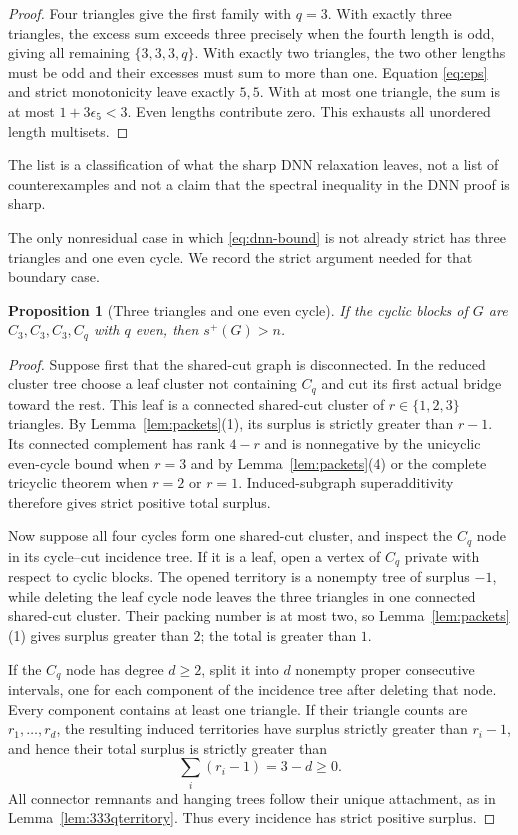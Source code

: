 \documentclass[11pt]{article}
\newtheorem{proposition}[theorem]{Proposition}
\theoremstyle{remark}
\begin{document}
\begin{proof}
Four triangles give the first family with $q=3$.  With exactly three
triangles, the excess sum exceeds three precisely when the fourth length is
odd, giving all remaining $\{3,3,3,q\}$.  With exactly two triangles, the two
other lengths must be odd and their excesses must sum to more than one.
Equation \eqref{eq:eps} and strict monotonicity leave exactly $5,5$.  With at
most one triangle, the sum is at most
$1+3\epsilon_5<3$.  Even lengths contribute zero.  This exhausts all
unordered length multisets.
\end{proof}

The list is a classification of what the sharp DNN relaxation leaves, not a
list of counterexamples and not a claim that the spectral inequality in the
DNN proof is sharp.

The only nonresidual case in which \eqref{eq:dnn-bound} is not already strict
has three triangles and one even cycle.  We record the strict argument needed
for that boundary case.

\begin{proposition}[Three triangles and one even cycle]\label{prop:333even}
If the cyclic blocks of $G$ are $C_3,C_3,C_3,C_q$ with $q$ even, then
$s^+(G)>n$.
\end{proposition}

\begin{proof}
Suppose first that the shared-cut graph is disconnected.  In the reduced
cluster tree choose a leaf cluster not containing $C_q$ and cut its first
actual bridge toward the rest.  This leaf is a connected shared-cut cluster of
$r\in\{1,2,3\}$ triangles.  By Lemma~\ref{lem:packets}(1), its surplus is
strictly greater than $r-1$.  Its connected complement has rank $4-r$ and is
nonnegative by the unicyclic even-cycle bound when $r=3$ and by
Lemma~\ref{lem:packets}(4) or the complete tricyclic theorem when $r=2$ or
$r=1$.  Induced-subgraph superadditivity therefore gives strict positive total
surplus.

Now suppose all four cycles form one shared-cut cluster, and inspect the
$C_q$ node in its cycle--cut incidence tree.  If it is a leaf, open a vertex
of $C_q$ private with respect to cyclic blocks.  The opened territory is a
nonempty tree of surplus $-1$, while deleting the leaf cycle node leaves the
three triangles in one connected shared-cut cluster.  Their packing number is
at most two, so Lemma~\ref{lem:packets}(1) gives surplus greater than $2$;
the total is greater than $1$.

If the $C_q$ node has degree $d\geq2$, split it into $d$ nonempty proper
consecutive intervals, one for each component of the incidence tree after
deleting that node.  Every component contains at least one triangle.  If their
triangle counts are $r_1,\ldots,r_d$, the resulting induced territories have
surplus strictly greater than $r_i-1$, and hence their total surplus is
strictly greater than
\[
 \sum_i(r_i-1)=3-d\geq0.
\]
All connector remnants and hanging trees follow their unique attachment, as in
Lemma~\ref{lem:333qterritory}.  Thus every incidence has strict positive
surplus.
\end{proof}
\end{document}
